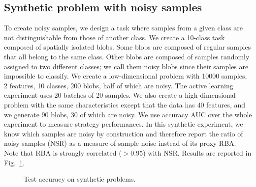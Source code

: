 \documentclass[runningheads]{llncs}
\begin{document}
\subsection{Synthetic problem with noisy samples}

To create noisy samples, we design a task where samples from a given class are not distinguishable
from those of another class. We create a 10-class task composed of spatially isolated blobs. 
Some blobs are composed of regular samples that all belong to the same class.
Other blobs are composed of samples randomly assigned to two different classes; we call them
noisy blobs since their samples are impossible to classify.
We create a low-dimensional problem with 10000 samples, 2 features, 10 classes, 200 blobs,
half of which are noisy. The active learning experiment uses 20 batches of 20 samples. We also
create a high-dimensional problem with the same characteristics except that the data has 40 features, and
we generate 90 blobs, 30 of which are noisy. We use accuracy AUC over the whole experiment to measure strategy performances.
In this synthetic experiment, we know which samples are noisy by construction and therefore report the ratio of noisy samples (NSR) as a measure of sample noise instead of its proxy RBA. Note that RBA is strongly correlated ($> 0.95$) with NSR.
Results are reported in Fig.~\ref{fig:synthetic}.

\begin{figure}[htp]
  \centering
  \hfill
  
  \caption{Test accuracy on synthetic problems.}
  \label{fig:synthetic}
  
\end{figure}
\end{document}
